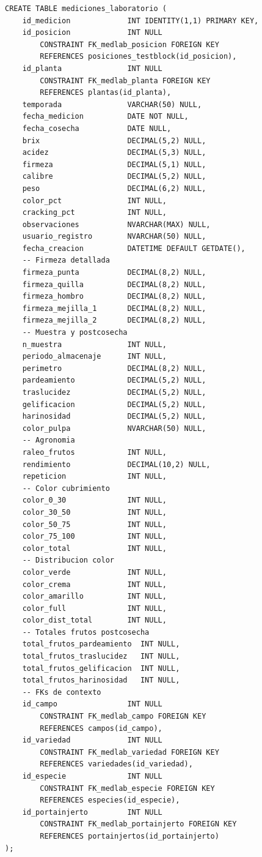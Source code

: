 \documentclass[12pt,a4paper,twoside]{report}
\begin{document}
\begin{lstlisting}[style=sqlstyle, caption={mediciones\_laboratorio}]
CREATE TABLE mediciones_laboratorio (
    id_medicion             INT IDENTITY(1,1) PRIMARY KEY,
    id_posicion             INT NULL
        CONSTRAINT FK_medlab_posicion FOREIGN KEY
        REFERENCES posiciones_testblock(id_posicion),
    id_planta               INT NULL
        CONSTRAINT FK_medlab_planta FOREIGN KEY
        REFERENCES plantas(id_planta),
    temporada               VARCHAR(50) NULL,
    fecha_medicion          DATE NOT NULL,
    fecha_cosecha           DATE NULL,
    brix                    DECIMAL(5,2) NULL,
    acidez                  DECIMAL(5,3) NULL,
    firmeza                 DECIMAL(5,1) NULL,
    calibre                 DECIMAL(5,2) NULL,
    peso                    DECIMAL(6,2) NULL,
    color_pct               INT NULL,
    cracking_pct            INT NULL,
    observaciones           NVARCHAR(MAX) NULL,
    usuario_registro        NVARCHAR(50) NULL,
    fecha_creacion          DATETIME DEFAULT GETDATE(),
    -- Firmeza detallada
    firmeza_punta           DECIMAL(8,2) NULL,
    firmeza_quilla          DECIMAL(8,2) NULL,
    firmeza_hombro          DECIMAL(8,2) NULL,
    firmeza_mejilla_1       DECIMAL(8,2) NULL,
    firmeza_mejilla_2       DECIMAL(8,2) NULL,
    -- Muestra y postcosecha
    n_muestra               INT NULL,
    periodo_almacenaje      INT NULL,
    perimetro               DECIMAL(8,2) NULL,
    pardeamiento            DECIMAL(5,2) NULL,
    traslucidez             DECIMAL(5,2) NULL,
    gelificacion            DECIMAL(5,2) NULL,
    harinosidad             DECIMAL(5,2) NULL,
    color_pulpa             NVARCHAR(50) NULL,
    -- Agronomia
    raleo_frutos            INT NULL,
    rendimiento             DECIMAL(10,2) NULL,
    repeticion              INT NULL,
    -- Color cubrimiento
    color_0_30              INT NULL,
    color_30_50             INT NULL,
    color_50_75             INT NULL,
    color_75_100            INT NULL,
    color_total             INT NULL,
    -- Distribucion color
    color_verde             INT NULL,
    color_crema             INT NULL,
    color_amarillo          INT NULL,
    color_full              INT NULL,
    color_dist_total        INT NULL,
    -- Totales frutos postcosecha
    total_frutos_pardeamiento  INT NULL,
    total_frutos_traslucidez   INT NULL,
    total_frutos_gelificacion  INT NULL,
    total_frutos_harinosidad   INT NULL,
    -- FKs de contexto
    id_campo                INT NULL
        CONSTRAINT FK_medlab_campo FOREIGN KEY
        REFERENCES campos(id_campo),
    id_variedad             INT NULL
        CONSTRAINT FK_medlab_variedad FOREIGN KEY
        REFERENCES variedades(id_variedad),
    id_especie              INT NULL
        CONSTRAINT FK_medlab_especie FOREIGN KEY
        REFERENCES especies(id_especie),
    id_portainjerto         INT NULL
        CONSTRAINT FK_medlab_portainjerto FOREIGN KEY
        REFERENCES portainjertos(id_portainjerto)
);
\end{lstlisting}
\end{document}
